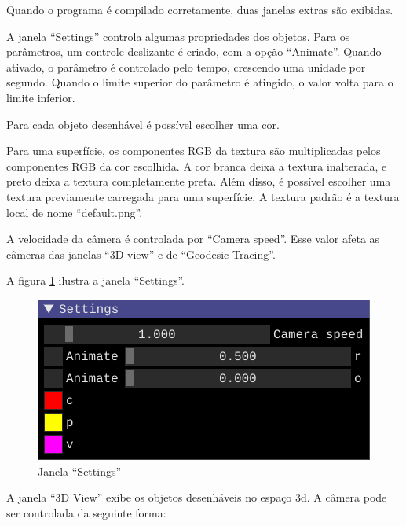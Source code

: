 Quando o programa é compilado corretamente, duas janelas extras são exibidas.

A janela ``Settings'' controla algumas propriedades dos objetos.
Para os parâmetros, um controle deslizante é criado, com a opção ``Animate''.
Quando ativado, o parâmetro é controlado pelo tempo,
crescendo uma unidade por segundo.
Quando o limite superior do parâmetro é atingido,
o valor volta para o limite inferior.

Para cada objeto desenhável é possível escolher uma cor.

Para uma superfície, os componentes RGB da textura
são multiplicadas pelos componentes RGB da cor escolhida.
A cor branca deixa a textura inalterada,
e preto deixa a textura completamente preta.
Além disso, é possível escolher uma textura previamente carregada para
uma superfície. A textura padrão é a textura local de nome ``default.png''.

A velocidade da câmera é controlada por ``Camera speed''.
Esse valor afeta as câmeras das janelas ``3D view'' e de ``Geodesic Tracing''.

A figura \ref{img:settings} ilustra a janela ``Settings''.

\begin{figure}[!ht]
    \includegraphics[width=\linewidth]{settings.png}
    \caption{Janela ``Settings''}
    \label{img:settings}
\end{figure}

A janela ``3D View'' exibe os objetos desenháveis no espaço 3d.
A câmera pode ser controlada da seguinte forma:

